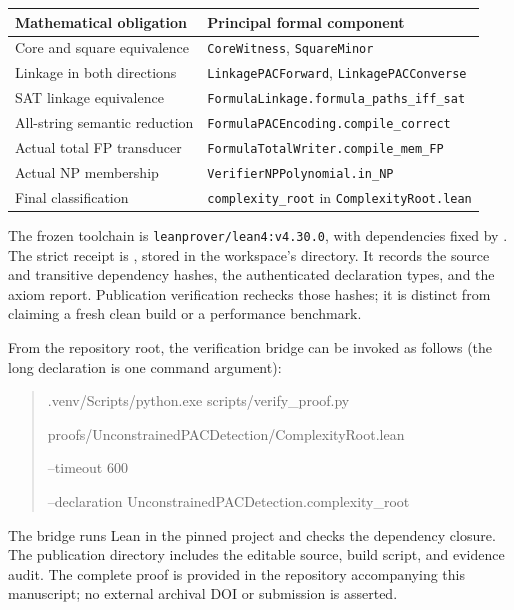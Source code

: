 \documentclass[11pt,a4paper]{article}
\begin{document}
\begin{center}
\small
\begin{tabular}{@{}p{.35\linewidth}p{.59\linewidth}@{}}
\toprule
Mathematical obligation & Principal formal component\\
\midrule
Core and square equivalence & \texttt{CoreWitness}, \texttt{SquareMinor}\\
Linkage in both directions & \texttt{LinkagePACForward}, \texttt{LinkagePACConverse}\\
SAT linkage equivalence & \texttt{FormulaLinkage.formula\_paths\_iff\_sat}\\
All-string semantic reduction & \texttt{FormulaPACEncoding.compile\_correct}\\
Actual total FP transducer & \texttt{FormulaTotalWriter.compile\_mem\_FP}\\
Actual NP membership & \texttt{VerifierNPPolynomial.in\_NP}\\
Final classification & \texttt{complexity\_root} in \texttt{ComplexityRoot.lean}\\
\bottomrule
\end{tabular}
\end{center}

The frozen toolchain is \texttt{leanprover/lean4:v4.30.0}, with dependencies
fixed by . The strict receipt is
, stored in the workspace's
 directory. It records the source and transitive dependency hashes,
the authenticated declaration types, and the axiom report. Publication
verification rechecks those hashes; it is distinct from claiming a fresh
clean build or a performance benchmark.

From the repository root, the verification bridge can be invoked as follows
(the long declaration is one command argument):
\begin{quote}\small\ttfamily\raggedright
.venv/Scripts/python.exe scripts/verify\_proof.py\par
\quad proofs/UnconstrainedPACDetection/ComplexityRoot.lean\par
\quad --timeout 600\par
\quad --declaration UnconstrainedPACDetection.complexity\_root
\end{quote}
The bridge runs Lean in the pinned project and checks the dependency
closure. The publication directory includes the editable source,
build script, and evidence audit. The complete proof is provided in the
repository accompanying this manuscript; no external archival DOI or
submission is asserted.
\end{document}
